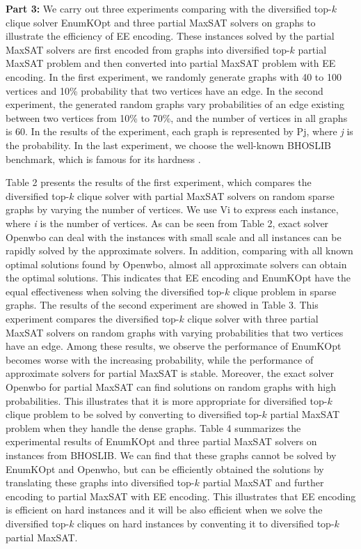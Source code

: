 \documentclass{llncs}
\begin{document}
{\bfseries Part 3:} We carry out three experiments comparing with the diversified top-$k$ clique solver EnumKOpt and three partial MaxSAT solvers on graphs to illustrate the efficiency of EE encoding. These instances solved by the partial MaxSAT solvers are first encoded from graphs into diversified top-$k$ partial MaxSAT problem and then converted into partial MaxSAT problem with EE encoding. In the first experiment, we randomly generate graphs with 40 to 100 vertices and 10\% probability that two vertices have an edge. In the second experiment, the generated random graphs vary probabilities of an edge existing between two vertices from 10\% to 70\%, and the number of vertices in all graphs is 60. In the results of the experiment, each graph is represented by Pj, where \textit {j} is the probability. In the last experiment, we choose the well-known BHOSLIB benchmark, which is famous for its hardness \cite{KeXu 2006}.

Table 2 presents the results of the first experiment, which compares the diversified top-$k$ clique solver with partial MaxSAT solvers on random sparse graphs by varying the number of vertices. We use Vi to express each instance, where \textit {i} is the number of vertices. As can be seen from Table 2, exact solver Openwbo can deal with the instances with small scale and all instances can be rapidly solved by the approximate solvers. In addition, comparing with all known optimal solutions found by Openwbo, almost all approximate solvers can obtain the optimal solutions. This indicates that EE encoding and EnumKOpt have the equal effectiveness when solving the diversified top-$k$ clique problem in sparse graphs. The results of the second experiment are showed in Table 3. This experiment compares the diversified top-$k$ clique solver with three partial MaxSAT solvers on random graphs with varying probabilities that two vertices have an edge. Among these results, we observe the performance of EnumKOpt becomes worse with the increasing probability, while the performance of approximate solvers for partial MaxSAT is stable. Moreover, the exact solver Openwbo for partial MaxSAT can find solutions on random graphs with high probabilities. This illustrates that it is more appropriate for diversified top-$k$ clique problem to be solved by converting to diversified top-$k$ partial MaxSAT problem when they handle the dense graphs. Table 4 summarizes the experimental results of EnumKOpt and three partial MaxSAT solvers on instances from BHOSLIB. We can find that these graphs cannot be solved by EnumKOpt and Openwho, but can be efficiently obtained the solutions by translating these graphs into diversified top-$k$ partial MaxSAT and further encoding to partial MaxSAT with EE encoding. This illustrates that EE encoding is efficient on hard instances and it will be also efficient when we solve the diversified top-$k$ cliques on hard instances by conventing it to diversified top-$k$ partial MaxSAT.
\end{document}
